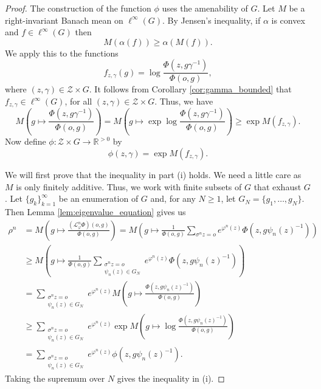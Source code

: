 \documentclass[10pt,a4paper]{amsart}
\def\vp{\varphi}
\begin{document}
\begin{proof}
The construction of the function $\phi$ uses the amenability of $G$.
Let $M$ be a right-invariant Banach mean on $\ell^\infty(G)$. By Jensen's inequality, if $\alpha$ is convex
and $f \in \ell^\infty(G)$
then
\[
M(\alpha(f)) \ge \alpha(M(f)).
\]
We apply this to the functions 
\[
f_{z,\gamma}(g) = \log \frac{\Phi(z,g\gamma^{-1})}{\Phi(o,g)},
\]
where $(z,\gamma) \in \mathcal Z \times G$.
It follows from Corollary \ref{cor:gamma_bounded} that $f_{z,\gamma} \in \ell^\infty(G)$, for all
$(z,\gamma) \in \mathcal Z \times G$. 
Thus, we have
\[
M\left(g \mapsto \frac{\Phi(z,g\gamma^{-1})}{\Phi(o,g)}\right)
= M\left(g \mapsto \exp \log \frac{\Phi(z,g\gamma^{-1})}{\Phi(o,g)}\right)
\ge \exp M(f_{z,\gamma}).
\]
Now define $\phi : \mathcal Z \times G \to \mathbb R^{>0}$ by
\[
\phi(z,\gamma) = \exp M(f_{z,\gamma}).
\]

We will first prove that the inequality in part (i) holds. We need a little care as $M$ is only finitely additive. Thus, we work with finite subsets of $G$ that exhaust $G$.
Let $\{g_k\}_{k=1}^\infty$ be an enumeration of $G$ and, for any $N \ge 1$, let 
$G_N = \{g_1,\ldots,g_N\}$. Then Lemma \ref{lem:eigenvalue_equation} gives us
\begin{align*}
\rho^n &=M\left(g \mapsto \frac{(\mathcal L_\vp^n \Phi)(o,g)}{\Phi(o,g)}\right)
= 
M
\left(g \mapsto \frac{1}{\Phi(o,g)}\sum_{\sigma^n z = o} e^{\vp^n(z)} \Phi(z,g\psi_n(z)^{-1})\right)
\\
&\ge
M
\left(g \mapsto \frac{1}{\Phi(o,g)}\sum_{\substack{\sigma^n z = o \\ \psi_n(z) \in G_N}} 
e^{\vp^n(z)} \Phi(z,g\psi_n(z)^{-1})\right)
\\
&=
\sum_{\substack{\sigma^n z = o \\ \psi_n(z) \in G_N}} e^{\vp^n(z)}
M\left(g \mapsto \frac{\Phi(z,g\psi_n(z)^{-1})}{\Phi(o,g)}\right)
\\
&\ge
\sum_{\substack{\sigma^n z = o \\ \psi_n(z) \in G_N}} e^{\vp^n(z)}
\exp M\left(g \mapsto \log \frac{\Phi(z,g\psi_n(z)^{-1})}{\Phi(o,g)}\right)
\\
&=
\sum_{\substack{\sigma^n z = o \\ \psi_n(z) \in G_N}} e^{\vp^n(z)}
\phi(z,g\psi_n(z)^{-1}).
\end{align*}
Taking the supremum over $N$ gives the inequality in (i).



\end{proof}
\end{document}
